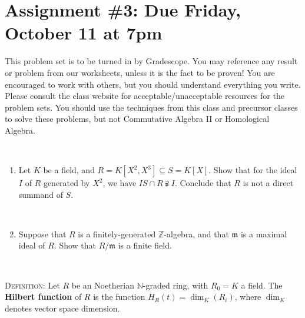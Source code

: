 \documentclass[12pt]{amsart}
\newcommand{\N}{\mathbb{N}}
\newcommand{\Z}{\mathbb{Z}}
\newcommand{\m}{\mathfrak{m}}
\newcommand{\showsol}[1]{\def\displaysol{#1}}
\begin{document}
\showsol{1}
	
	\thispagestyle{empty}
	
	\section*{Assignment \#3: Due Friday, October 11 at 7pm}
	
	This problem set is to be turned in by Gradescope. You may reference any result or problem from our worksheets, unless it is the fact to be proven! You are encouraged to work with others, but you should understand everything you write. Please consult the class website for acceptable/unacceptable resources for the problem sets. You should use the techniques from this class and precursor classes to solve these problems, but not Commutative Algebra II or Homological Algebra. 
	
	\
	
	
	
	
\begin{enumerate}

\item Let $K$ be a field, and $R=K[X^2,X^3] \subseteq S=K[X]$. Show that for the ideal $I$ of $R$ generated by $X^2$, we have $I S \cap R \supsetneqq I$. Conclude that $R$ is not a direct summand of $S$.


\

\item Suppose that $R$ is a finitely-generated $\Z$-algebra, and that $\m$ is a maximal ideal of $R$. Show that $R/\m$ is a finite field.

\

\end{enumerate}

\textsc{Definition:} Let $R$ be an Noetherian $\N$-graded ring, with $R_0=K$ a field. The \textbf{Hilbert function} of $R$ is the function $H_R(t) = \dim_{K}(R_i)$, where $\dim_K$ denotes vector space dimension.

\
\end{document}
